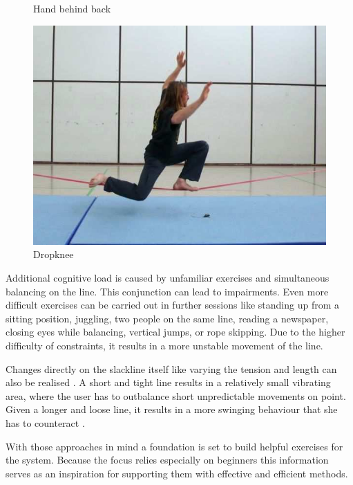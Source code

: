 \begin{figure}[htb]
\begin{minipage}[t]{0.3\linewidth}
		\caption{Hand behind back \cite{Kroiss2007-ab}}
		\label{fig:slacklineAdvancedHandsBehindBack}
	\end{minipage}	
	\hfill
	\begin{minipage}[t]{0.38\linewidth}
		\centering
		\includegraphics[width=1\linewidth]{Pictures/slacklineAdvancedDropknee}
		\caption{Dropknee \cite{Kroiss2007-ab}}
		\label{fig:slacklineAdvancedDropknee}
	\end{minipage}	
\end{figure}

Additional cognitive load is caused by unfamiliar exercises and simultaneous balancing on the line. This conjunction can lead to impairments. Even more difficult exercises can be carried out in further sessions like standing up from a sitting position, juggling, two people on the same line, reading a newspaper, closing eyes while balancing, vertical jumps, or rope skipping. Due to the higher difficulty of constraints, it results in a more unstable movement of the line.

 Changes directly on the slackline itself like varying the tension and length can also be realised \cite{Pfusterschmied2013-kq} \cite{Keller2012-xh} \cite{Pfusterschmied2013-yy}. A short and tight line results in a relatively small vibrating area, where the user has to outbalance short unpredictable movements on point. Given a longer and loose line, it results in a more swinging behaviour that she has to counteract \cite{Kroiss2007-ab}. 
 
With those approaches in mind a foundation is set to build helpful exercises for the system. Because the focus relies especially on beginners this information serves as an inspiration for supporting them with effective and efficient methods.

